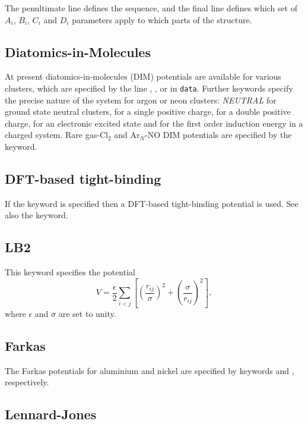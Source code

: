 \noindent The penultimate line defines the sequence, and the final line
defines which set of $A_i$, $B_i$, $C_i$ and $D_i$ parameters apply to which 
parts of the structure.\cite{BrownFH03}


\subsection{Diatomics-in-Molecules}

At present diatomics-in-molecules (DIM) potentials are available for various
clusters, which are specified by the line {\/}, {\/},
{} or {\/} in {\tt data}.
Further keywords specify the precise nature of the system for argon or
neon clusters: {\it NEUTRAL\/} for ground state neutral
clusters, {\/} for a single positive charge, {\/} for a double positive
charge, {\/} for an electronic excited state and {\/} for the first order
induction energy in a charged system. Rare gas-Cl$_2$ and Ar$_N$-NO DIM potentials
are specified by the {\/} keyword.

\subsection{DFT-based tight-binding}

If the {\/} keyword is specified then a DFT-based tight-binding potential
is used. See also the {\/} keyword.

\subsection{LB2}

This keyword specifies the potential\cite{LB299a,LB299b,LB204}
\begin{equation}
V = \frac{\epsilon}{2} \sum_{i<j} \left[ \left(\frac{r_{ij}}{\sigma}\right)^2+
\left(\frac{\sigma}{r_{ij}}\right)^2\right],
\end{equation}
where $\epsilon$ and $\sigma$ are set to unity.

\subsection{Farkas}

The Farkas potentials for aluminium and nickel are specified by keywords {\/} and
{\/}, respectively.

\subsection{Lennard-Jones}


